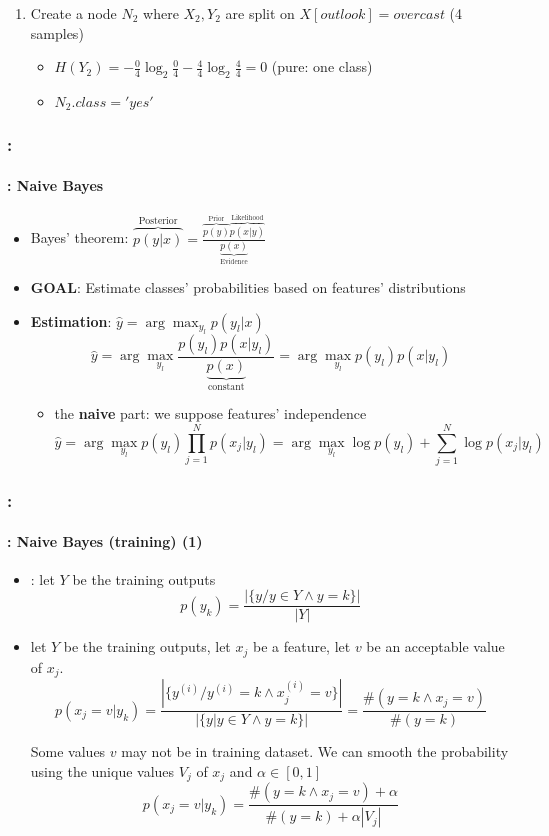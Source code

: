 \documentclass[xcolor=table]{beamer}
\begin{document}
\begin{frame}
\begin{enumerate}
		\item Create a node $ N_2 $ where $ X_2, Y_2 $ are split on $ X[outlook] = overcast$ (4 samples)
		\begin{itemize}\tiny\bfseries
			\item $ H(Y_2) = - \frac{0}{4} \log_2 \frac{0}{4} - \frac{4}{4} \log_2 \frac{4}{4} = 0$ (pure: one class)
			\item $ N_2.class = 'yes' $
		\end{itemize}
	
	\end{enumerate}
\end{frame}

\begin{frame}
	\frametitle{\insertshortsubtitle: \insertsection}
	\framesubtitle{\insertsubsection: Naive Bayes}
	
	\begin{itemize}
		\item Bayes' theorem: $ \overbrace{p(y|x)}^\text{Posterior} = \frac{\overbrace{p(y)}^\text{Prior} \overbrace{p(x|y)}^{\text{Likelihood}}}{\underbrace{p(x)}_\text{Evidence}}$
		\item \textbf{GOAL}: Estimate classes' probabilities based on features' distributions
		\item \textbf{Estimation}: $ \hat{y} = \arg\max_{y_l} p(y_l|x)$
		\[\hat{y} = \arg\max_{y_l} \frac{p(y_l) p(x|y_l)}{\underbrace{p(x)}_\text{constant}} = \arg\max_{y_l} p(y_l) p(x|y_l)\]
		\begin{itemize}
			\item the \textbf{naive} part: we suppose features' independence
			\[\hat{y} = \arg\max_{y_l} p(y_l) \prod_{j=1}^{N} p(x_j|y_l) = \arg\max_{y_l} \log p(y_l) + \sum_{j=1}^{N} \log p(x_j|y_l)\]
		\end{itemize}
	\end{itemize}
	
\end{frame}

\begin{frame}
	\frametitle{\insertshortsubtitle: \insertsection}
	\framesubtitle{\insertsubsection: Naive Bayes (training) (1)}
	\small
	
	\begin{itemize}
		\item {}: let $ Y $ be the training outputs
		\[p(y_k) = \frac{|\{y / y \in Y \wedge y = k\}|}{|Y|}\]
		
		\item {} let $ Y $ be the training outputs, let $ x_j $ be a feature, let $ v $ be an acceptable value of $ x_j $.
		\[p(x_j = v|y_k) = \frac{|\{y^{(i)} / y^{(i)} = k \wedge x^{(i)}_j = v\}|}{|\{y | y \in Y \wedge y = k\}|} = \frac{\#(y = k \wedge x_j = v)}{\#(y = k)}\]
		
		Some values $v$ may not be in training dataset. We can smooth the probability using the unique values $ V_j $ of $ x_j $ and $ \alpha \in [0, 1] $
		\[p(x_j = v|y_k) = \frac{\#(y = k \wedge x_j = v) + \alpha}{\#(y = k) + \alpha |V_j|}\]
	\end{itemize}
	
\end{frame}
\end{document}
